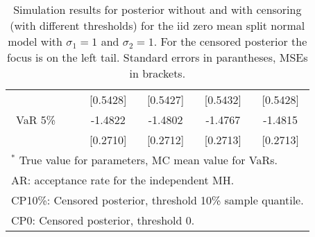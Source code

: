 {\begin{table}
\begin{tabular}{cc cccc}
  && [0.5428] & [0.5427] & [0.5432] & [0.5428]  \\ 
VaR 5\% && -1.4822 & -1.4802 & -1.4767 & -1.4815  \\ 
 && [0.2710] & [0.2712] & [0.2713] & [0.2713]  \\ 
\hline 
\multicolumn{6}{l}{\footnotesize{$^*$ True value for parameters, MC mean value for VaRs.}}  \\ 
\multicolumn{6}{l}{\footnotesize{AR: acceptance rate for the independent MH.}}  \\ 
\multicolumn{6}{l}{\footnotesize{CP10\%: Censored posterior, threshold 10\% sample quantile.}}  \\ 
\multicolumn{6}{l}{\footnotesize{CP0: Censored posterior, threshold 0.}} 
\end{tabular}
 \caption{Simulation results for posterior without and with censoring (with different thresholds) for the iid zero mean split normal model with $\sigma_{1} = 1$ and $\sigma_{2} = 1$. For the censored posterior the focus is on the left tail. Standard errors in parantheses, MSEs in brackets.} 
\label{tab:iid}  
\end{table}
}